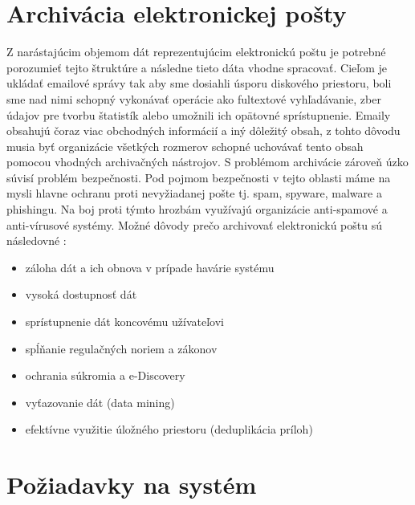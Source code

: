 \documentclass[11pt,twoside,a4paper]{book}
\begin{document}

\section{Archivácia elektronickej pošty}


Z narástajúcim objemom dát reprezentujúcim elektronickú poštu je potrebné porozumieť tejto štruktúre a následne tieto dáta vhodne spracovať. Cieľom je ukládať emailové správy tak aby sme dosiahli úsporu diskového priestoru, boli sme nad nimi schopný vykonávať operácie ako fultextové vyhľadávanie, zber údajov pre tvorbu štatistík alebo umožnili ich opätovné sprístupnenie. Emaily obsahujú čoraz viac obchodných informácií a iný dôležitý obsah, z tohto dôvodu musia byť organizácie všetkých rozmerov schopné uchovávať tento obsah pomocou vhodných archivačných nástrojov. S problémom archivácie zároveň úzko súvisí problém bezpečnosti. Pod pojmom bezpečnosti v tejto oblasti máme na mysli hlavne ochranu proti nevyžiadanej pošte tj. spam, spyware, malware a phishingu. Na boj proti týmto hrozbám využívajú organizácie anti-spamové a anti-vírusové systémy. Možné dôvody prečo archivovať elektronickú poštu sú následovné \cite{WhyArchiving}:
\begin{itemize}
 \item 
  záloha dát a ich obnova v prípade havárie systému
 \item
  vysoká dostupnosť dát
 \item
  sprístupnenie dát koncovému užívateľovi
 \item
  spĺňanie regulačných noriem a zákonov
 \item
  ochrania súkromia a e-Discovery
 \item
  vyťazovanie dát (data mining)
 \item
  efektívne využitie úložného priestoru (deduplikácia príloh)
\end{itemize}


\section{Požiadavky na systém}
\end{document}
